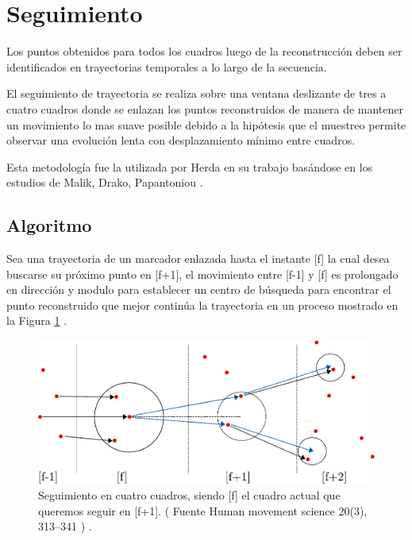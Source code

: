 \section{Seguimiento}

Los puntos obtenidos para todos los cuadros luego de la reconstrucción deben ser identificados en trayectorias temporales a lo largo de la secuencia.


El seguimiento de trayectoria se realiza sobre una ventana deslizante de tres a cuatro cuadros donde se enlazan los puntos reconstruidos de manera de mantener un movimiento lo mas suave posible debido a la hipótesis que el muestreo permite observar una evolución lenta con desplazamiento mínimo entre cuadros.


Esta metodología fue la utilizada por Herda \cite{herda} en su trabajo basándose en los estudios de Malik, Drako, Papantoniou \cite{griegos} .

\subsection{Algoritmo}

Sea una trayectoria de un marcador enlazada hasta el instante [f] la cual desea buscarse su próximo punto en [f+1], el movimiento entre [f-1] y [f] es prolongado en dirección y modulo para establecer un centro de búsqueda para encontrar el punto reconstruido que mejor continúa la trayectoria en un proceso mostrado en la Figura \ref{herda_00} .

\begin{figure}[ht!]
\begin{center}
\includegraphics[scale=0.6]{imagenes/Seguimiento/tracking-eps-converted-to.pdf}
\end{center}
\caption{Seguimiento en cuatro cuadros, siendo [f] el cuadro actual que queremos seguir en [f+1]. ( Fuente  Human movement
science 20(3), 313–341 \cite{herda} ) .}
\label{herda_00}
\end{figure}

